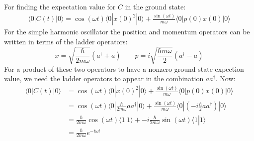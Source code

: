 \documentclass[12pt,a4]{article}
\begin{document}
\begin{enumerate}
\begin{enumerate}
\begin{align*}
        \end{align*}
        For finding the expectation value for $C$ in the ground state:
        \begin{align*}
          \langle 0 |C(t) |0 \rangle =  \cos (\omega t) \langle 0 | x(0)^2 | 0 \rangle + \frac{\sin(\omega t)}{m \omega} \langle 0 | p(0) x(0)| 0 \rangle
        \end{align*}
        For the simple harmonic oscillator the position and momentum operators can be written in terms of the ladder operators:
        \begin{equation*}
          x = \sqrt{\frac{\hbar}{2 m \omega}} (a^\dagger + a) \qquad p = i \sqrt{\frac{\hbar m \omega}{2}} (a^\dagger - a)
        \end{equation*}
        For a product of these two operators to have a nonzero ground state expection value, we need the ladder operators to appear in the combination $a a^\dagger$.
        Now:
        \begin{align*}
          \langle 0 |C(t) |0 \rangle &=  \cos (\omega t) \langle 0 | x(0)^2 | 0 \rangle + \frac{\sin(\omega t)}{m \omega} \langle 0 | p(0) x(0)| 0 \rangle\\
                                     &=  \cos (\omega t) \langle 0 | \frac{\hbar}{2 m \omega} a a^\dagger | 0 \rangle + \frac{\sin(\omega t)}{m \omega} \langle 0 |\left( -i\frac{\hbar}{2} a a^\dagger \right) |0 \rangle\\
                                     &=  \frac{\hbar}{2 m \omega}\cos (\omega t) \langle 1 |   1 \rangle + -i\frac{\hbar}{2m \omega}\sin(\omega t) \langle 1    |1 \rangle\\
                                     &=  \frac{\hbar}{ 2 m \omega}e^{-i \omega t} 
        \end{align*}
        

\end{enumerate}
\end{enumerate}
\end{document}
